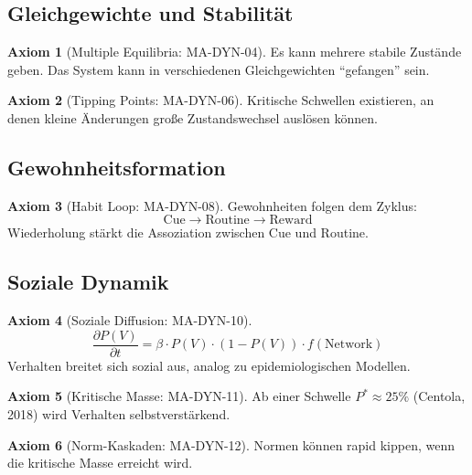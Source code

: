 \documentclass[11pt,a4paper]{article}
\theoremstyle{definition}
\newtheorem{axiom}{Axiom}[section]
\theoremstyle{plain}
\begin{document}
\subsection{Gleichgewichte und Stabilität}

\begin{axiom}[Multiple Equilibria: MA-DYN-04]
Es kann mehrere stabile Zustände geben. Das System kann in verschiedenen Gleichgewichten ``gefangen'' sein.
\end{axiom}

\begin{axiom}[Tipping Points: MA-DYN-06]
Kritische Schwellen existieren, an denen kleine Änderungen große Zustandswechsel auslösen können.
\end{axiom}

\subsection{Gewohnheitsformation}

\begin{axiom}[Habit Loop: MA-DYN-08]
Gewohnheiten folgen dem Zyklus:
\begin{equation}
\text{Cue} \rightarrow \text{Routine} \rightarrow \text{Reward}
\end{equation}
Wiederholung stärkt die Assoziation zwischen Cue und Routine.
\end{axiom}

\subsection{Soziale Dynamik}

\begin{axiom}[Soziale Diffusion: MA-DYN-10]
\begin{equation}
\frac{\partial P(V)}{\partial t} = \beta \cdot P(V) \cdot (1 - P(V)) \cdot f(\text{Network})
\end{equation}
Verhalten breitet sich sozial aus, analog zu epidemiologischen Modellen.
\end{axiom}

\begin{axiom}[Kritische Masse: MA-DYN-11]
Ab einer Schwelle $P^* \approx 25\%$ (Centola, 2018) wird Verhalten selbstverstärkend.
\end{axiom}

\begin{axiom}[Norm-Kaskaden: MA-DYN-12]
Normen können rapid kippen, wenn die kritische Masse erreicht wird.
\end{axiom}
\end{document}
